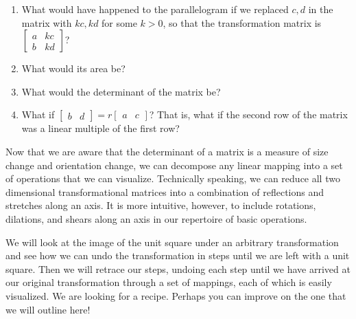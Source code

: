 \documentclass[../textbook.tex]{subfiles}
\begin{document}
\begin{enumerate}
\begin{enumerate}
\begin{enumerate}
\item What would have happened to the parallelogram if we replaced $c,d$ in the matrix with $kc,kd$ for some $k>0$, so that the transformation matrix is $\left[\begin{array}{cc} a & kc \\ b & kd \end{array}\right]$?
\item What would its area be?
\item What would the determinant of the matrix be?
\item What if $\left[\begin{array}{cc}b & d \end{array}\right]=r\left[\begin{array}{cc}a & c \end{array}\right]$? That is, what if the second row of the matrix was a linear multiple of the first row?
\end{enumerate}
\end{enumerate}
\setcounter{problem_i}{\value{enumi}}
\end{enumerate}

\noindent Now that we are aware that the determinant of a matrix is a measure of size change and orientation change, we can decompose any linear mapping into a set of operations that we can visualize. Technically speaking, we can reduce all two dimensional transformational matrices into a combination of reflections and stretches along an axis. It is more intuitive, however, to include rotations, dilations, and shears along an axis in our repertoire of basic operations.

We will look at the image of the unit square under an arbitrary transformation and see how we can undo the transformation in steps until we are left with a unit square. Then we will retrace our steps, undoing each step until we have arrived at our original transformation through a set of mappings, each of which is easily visualized. We are looking for a recipe. Perhaps you can improve on the one that we will outline here! %

\end{document}
